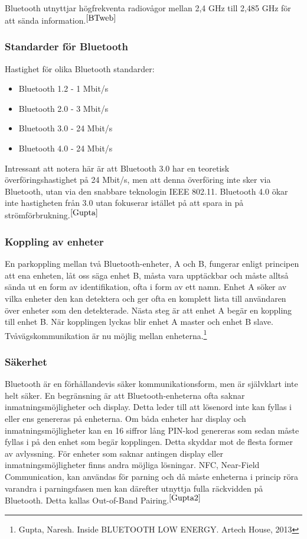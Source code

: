 \documentclass[a4paper,12pt,fleqn]{article}
\begin{document}
Bluetooth utnyttjar högfrekventa radiovågor mellan 2,4 GHz till 2,485 GHz för att sända information.$^{\ref{BTweb}}$

\subsubsection{Standarder för Bluetooth}
Hastighet för olika Bluetooth standarder:
\begin{itemize}
\item Bluetooth 1.2 - 1 Mbit/s 
\item Bluetooth 2.0 - 3 Mbit/s
\item Bluetooth 3.0 - 24 Mbit/s
\item Bluetooth 4.0 - 24 Mbit/s
\end{itemize}

Intressant att notera här är att Bluetooth 3.0 har en teoretisk överföringshastighet på 24 Mbit/s, men att denna överföring inte sker via Bluetooth, utan via den snabbare teknologin IEEE 802.11. 
Bluetooth 4.0 ökar inte hastigheten från 3.0 utan fokuserar istället på att spara in på strömförbrukning.$^{\ref{Gupta}}$


\subsubsection{Koppling av enheter}
En parkoppling mellan två Bluetooth-enheter, A och B, fungerar enligt principen att ena enheten, låt oss säga enhet B, måsta vara upptäckbar och måste alltså sända ut en form av identifikation, ofta i form av ett namn. Enhet A söker av vilka enheter den kan detektera och ger ofta en komplett lista till användaren över enheter som den detekterade. Nästa steg är att enhet A begär en koppling till enhet B. När kopplingen lyckas blir enhet A master och enhet B slave. Tvåvägskommunikation är nu möjlig mellan enheterna.\footnote{\label{Gupta2}Gupta, Naresh. Inside BLUETOOTH LOW ENERGY. Artech House, 2013}

\subsubsection{Säkerhet}
Bluetooth är en förhållandevis säker kommunikationsform, men är självklart inte helt säker. En begränsning är att Bluetooth-enheterna ofta saknar inmatningsmöjligheter och display. Detta leder till att lösenord inte kan fyllas i eller ens genereras på enheterna. Om båda enheter har display och inmatningsmöjligheter kan en 16 siffror lång PIN-kod genereras som sedan måste fyllas i på den enhet som begär kopplingen. Detta skyddar mot de flesta former av avlyssning.
För enheter som saknar antingen display eller inmatningsmöjligheter finns andra möjliga lösningar. NFC, Near-Field Communication, kan användas för parning och då måste enheterna i princip röra varandra i parningsfasen men kan därefter utnyttja fulla räckvidden på Bluetooth. Detta kallas Out-of-Band Pairing.$^{\ref{Gupta2}}$
\end{document}
